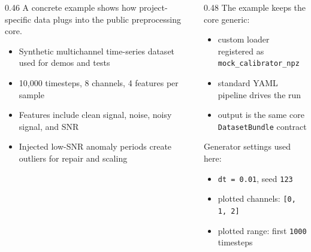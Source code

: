 \begin{frame}[plain]

  \vspace{14mm}
  \begin{columns}[T,onlytextwidth]
    \begin{column}{0.46\textwidth}
      {\small A concrete example shows how project-specific data plugs into the public preprocessing core.}\par
      \vspace{2mm}
      \begin{itemize}
        \item Synthetic multichannel time-series dataset used for demos and tests
        \item 10{,}000 timesteps, 8 channels, 4 features per sample
        \item Features include clean signal, noise, noisy signal, and SNR
        \item Injected low-SNR anomaly periods create outliers for repair and scaling
      \end{itemize}
    \end{column}
    \begin{column}{0.48\textwidth}
      {\small The example keeps the core generic:}\par
      \vspace{1.5mm}
      \begin{itemize}
        \item custom loader registered as \texttt{mock\_calibrator\_npz}
        \item standard YAML pipeline drives the run
        \item output is the same core \texttt{DatasetBundle} contract
      \end{itemize}

      \vspace{3mm}
      {\small Generator settings used here:}\par
      \vspace{1mm}
      \begin{itemize}
        \item \texttt{dt = 0.01}, seed \texttt{123}
        \item plotted channels: \texttt{[0, 1, 2]}
        \item plotted range: first \texttt{1000} timesteps
      \end{itemize}
    \end{column}
  \end{columns}

  \slideheaderfooter
\end{frame}
